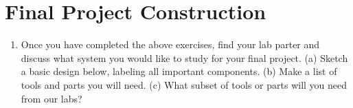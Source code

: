 \documentclass{article}
\begin{document}
\section{Final Project Construction}

\begin{enumerate}
\item Once you have completed the above exercises, find your lab parter and discuss what system you would like to study for your final project. (a) Sketch a basic design below, labeling all important components. (b) Make a list of tools and parts you will need.  (c) What subset of tools or parts will you need from our labs?
\end{enumerate}
\end{document}
